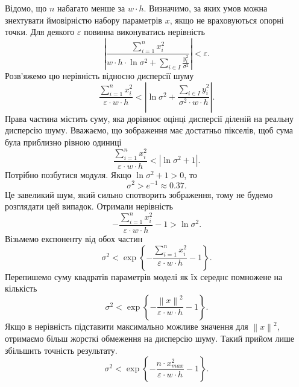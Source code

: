 Відомо, що $n$ набагато менше за $w \cdot h$.
Визначимо, за яких умов можна знехтувати ймовірністю набору параметрів $x$,
якщо не враховуються опорні точки.
Для деякого $\varepsilon$ повинна виконуватись нерівність
\begin{equation*}
  \left|
    \frac{\sum\limits_{i = 1}^n x_i^2}
         {w \cdot h \cdot \ln{\sigma^2}
          + \sum\limits_{i \in I}
            \frac{ y_i^2}{\sigma^2}}
  \right|
  < \varepsilon.
\end{equation*}
Розв'яжемо цю нерівність відносно дисперсії шуму
\begin{equation*}
  \frac{\sum\limits_{i = 1}^n x_i^2}{\varepsilon \cdot w \cdot h}
  < \left| \ln\sigma^2
    + \frac{\sum\limits_{i \in I} y_i^2}
           {\sigma^2 \cdot w \cdot h}
   \right|.
\end{equation*}
Права частина містить суму, яка дорівнює оцінці дисперсії
діленій на реальну дисперсію шуму.
Вважаємо, що зображення має достатньо пікселів,
щоб сума була приблизно рівною одиниці
\begin{equation*}
  \frac{\sum\limits_{i = 1}^n x_i^2}{\varepsilon \cdot w \cdot h}
  < \left| \ln\sigma^2 + 1 \right|.
\end{equation*}
Потрібно позбутися модуля.
Якщо $\ln\sigma^2 + 1 > 0$, то
\begin{equation*}
  \sigma^2 > e^{-1} \approx 0.37.
\end{equation*}
Це завеликий шум, який сильно спотворить зображення,
тому не будемо розглядати цей випадок.
Отримали нерівність
\begin{equation*}
  - \frac{\sum\limits_{i = 1}^n x_i^2}{\varepsilon \cdot w \cdot h} - 1
  > \ln\sigma^2.
\end{equation*}
Візьмемо експоненту від обох частин
\begin{equation*}
  \sigma^2
  < \exp{\left\{
      - \frac{\sum\limits_{i = 1}^n x_i^2}
             {\varepsilon \cdot w \cdot h}
      - 1
    \right\}}.
\end{equation*}
Перепишемо суму квадратів параметрів моделі як їх середнє помножене на кількість
\begin{equation*}
  \sigma^2
  < \exp{\left\{
      - \frac{\left\| x \right\|^2}
             {\varepsilon \cdot w \cdot h}
      - 1
    \right\}}.
\end{equation*}
Якщо в нерівність підставити максимально можливе значення для
$\left\| x \right\|^2$,
отримаємо більш жорсткі обмеження на дисперсію шуму.
Такий прийом лише збільшить точність результату.
\begin{equation*}
  \sigma^2
  < \exp{\left\{
      - \frac{n \cdot x_{max}^2}
             {\varepsilon \cdot w \cdot h}
      - 1
    \right\}}.
\end{equation*}

